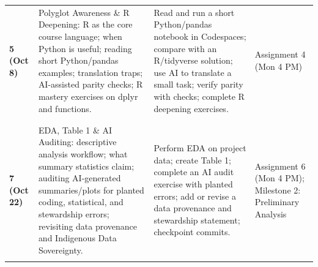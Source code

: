 \documentclass[
  letterpaper,
  DIV=11,
  numbers=noendperiod,
  oneside]{scrreprt}
\begin{document}
\begin{longtable*}{>{\raggedright\arraybackslash}p{2cm}>{\raggedright\arraybackslash}p{5cm}>{\raggedright\arraybackslash}p{5cm}>{\raggedright\arraybackslash}p{3.5cm}}
\hspace{1em}\textcolor{brandblue}{\textbf{5 (Oct 8)}} & Polyglot Awareness \& R Deepening: R as the core course language; when Python is useful; reading short Python/pandas examples; translation traps; AI-assisted parity checks; R mastery exercises on dplyr and functions. & Read and run a short Python/pandas notebook in Codespaces; compare with an R/tidyverse solution; use AI to translate a small task; verify parity with checks; complete R deepening exercises. & Assignment 4 (Mon 4 PM)\\
\addlinespace[0.3em]
\\
\hspace{1em}\textcolor{brandblue}{\textbf{}} &  &  & \\
\hspace{1em}\textcolor{brandblue}{\textbf{7 (Oct 22)}} & EDA, Table 1 \& AI Auditing: descriptive analysis workflow; what summary statistics claim; auditing AI-generated summaries/plots for planted coding, statistical, and stewardship errors; revisiting data provenance and Indigenous Data Sovereignty. & Perform EDA on project data; create Table 1; complete an AI audit exercise with planted errors; add or revise a data provenance and stewardship statement; checkpoint commits. & Assignment 6 (Mon 4 PM); Milestone 2: Preliminary Analysis\\
\hspace{1em}\textcolor{brandblue}{\textbf{}} &  &  & \\

\end{longtable*}
\end{document}
